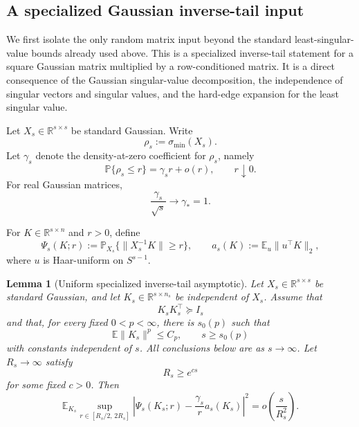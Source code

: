 \documentclass[11pt]{article}
\newtheorem{lemma}{Lemma}
\newcommand{\R}{\mathbb R}
\newcommand{\Pbb}{\mathbb P}
\newcommand{\Ebb}{\mathbb E}
\newcommand{\1}{\mathbf 1}
\begin{document}
\subsection{A specialized Gaussian inverse-tail input}

We first isolate the only random matrix input beyond the standard least-singular-value
bounds already used above.  This is a specialized inverse-tail statement for a square
Gaussian matrix multiplied by a row-conditioned matrix.  It is a direct consequence of the
Gaussian singular-value decomposition, the independence of singular vectors and singular
values, and the hard-edge expansion for the least singular value.

Let \(X_s\in\R^{s\times s}\) be standard Gaussian.  Write
\[
        \rho_s:=\sigma_{\min}(X_s).
\]
Let \(\gamma_s\) denote the density-at-zero coefficient for \(\rho_s\), namely
\begin{equation}
        \Pbb\{\rho_s\le r\}
        =
        \gamma_s r+o(r),
        \qquad r\downarrow0.
        \label{eq:gamma-s-def}
\end{equation}
For real Gaussian matrices,
\begin{equation}
        \frac{\gamma_s}{\sqrt{s}}
        \longrightarrow
        \gamma_\ast=1.
        \label{eq:gamma-limit}
\end{equation}

For \(K\in\R^{s\times n}\) and \(r>0\), define
\[
        \Psi_s(K;r)
        :=
        \Pbb_{X_s}\{\|X_s^{-1}K\|\ge r\},
        \qquad
        a_s(K)
        :=
        \Ebb_u\|u^\top K\|_2,
\]
where \(u\) is Haar-uniform on \(S^{s-1}\).

\begin{lemma}[Uniform specialized inverse-tail asymptotic]
\label{lem:specialized-inverse-tail}
Let \(X_s\in\R^{s\times s}\) be standard Gaussian, and let
\(K_s\in\R^{s\times n_s}\) be independent of \(X_s\). Assume that
\[
        K_sK_s^\top\succeq I_s
\]
and that, for every fixed \(0<p<\infty\), there is \(s_0(p)\) such that
\begin{equation}
        \Ebb\|K_s\|^p\le C_p,\qquad s\ge s_0(p)
        \label{eq:K-moment-bound}
\end{equation}
with constants independent of \(s\). All conclusions below are as \(s\to\infty\).
Let \(R_s\to\infty\) satisfy
\[
        R_s\ge e^{cs}
\]
for some fixed \(c>0\). Then
\begin{equation}
        \Ebb_{K_s}
        \sup_{r\in[R_s/2,\,2R_s]}
        \left|
        \Psi_s(K_s;r)
        -
        \frac{\gamma_s}{r}a_s(K_s)
        \right|^2
        =
        o\left(\frac{s}{R_s^2}\right).
        \label{eq:uniform-specialized-inverse-tail}
\end{equation}
\end{lemma}
\end{document}
